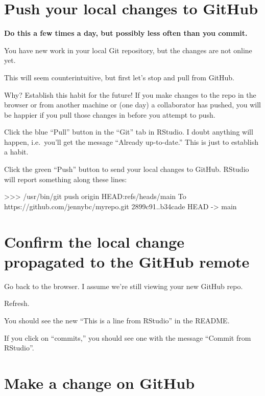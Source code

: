 \documentclass[
]{book}
\newenvironment{Shaded}{\begin{snugshade}}{\end{snugshade}}
\newcommand{\NormalTok}[1]{#1}
\begin{document}
\section{Push your local changes to GitHub}\label{push-your-local-changes-to-github}

\textbf{Do this a few times a day, but possibly less often than you commit.}

You have new work in your local Git repository, but the changes are not online yet.

This will seem counterintuitive, but first let's stop and pull from GitHub.

Why?
Establish this habit for the future!
If you make changes to the repo in the browser or from another machine or (one day) a collaborator has pushed, you will be happier if you pull those changes in before you attempt to push.

Click the blue ``Pull'' button in the ``Git'' tab in RStudio.
I doubt anything will happen, i.e.~you'll get the message ``Already up-to-date.''
This is just to establish a habit.

Click the green ``Push'' button to send your local changes to GitHub.
RStudio will report something along these lines:

\begin{Shaded}
\begin{Highlighting}[]
\NormalTok{\textgreater{}\textgreater{}\textgreater{} /usr/bin/git push origin HEAD:refs/heads/main}
\NormalTok{To https://github.com/jennybc/myrepo.git}
\NormalTok{   2899c91..b34cade  HEAD {-}\textgreater{} main}
\end{Highlighting}
\end{Shaded}

\section{Confirm the local change propagated to the GitHub remote}\label{confirm-the-local-change-propagated-to-the-github-remote-2}

Go back to the browser.
I assume we're still viewing your new GitHub repo.

Refresh.

You should see the new ``This is a line from RStudio'' in the README.

If you click on ``commits,'' you should see one with the message ``Commit from RStudio''.

\section{Make a change on GitHub}\label{make-a-change-on-github}
\end{document}
